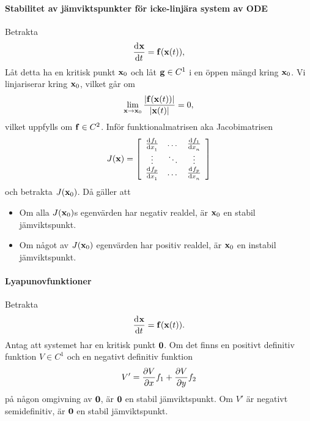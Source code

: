\paragraph{Stabilitet av jämviktspunkter för icke-linjära system av ODE}
Betrakta
\begin{align*}
	\dv[]{\vb{x}}{t} (t) = \vb{f}(\vb{x}(t)),
\end{align*}
Låt detta ha en kritisk punkt $\vb{x}_{0}$ och låt $\vb{g}\in C^{1}$ i en öppen mängd kring $\vb{x}_{0}$. Vi linjariserar kring $\vb{x}_{0}$, vilket går om
\begin{align*}
	\lim\limits_{\vb{x}\to\vb{x}_{0}}\frac{\abs{\vb{f}(\vb{x}(t))}}{\abs{\vb{x}(t)}} = 0,
\end{align*}
vilket uppfylls om $\vb{f}\in C^{2}$. Inför funktionalmatrisen aka Jacobimatrisen
\begin{align*}
	J(\vb{x}) = 
	\left[\begin{array}{ccc}
		\dv[]{f_1}{x_1} (\vb{x}) & \dots  & \dv[]{f_1}{x_n} (\vb{x}) \\
		\vdots                     & \ddots & \vdots \\
		\dv[]{f_p}{x_1} (\vb{x}) & \dots  & \dv[]{f_p}{x_n} (\vb{x})
	\end{array}\right]
\end{align*}
och betrakta $J(\vb{x}_{0})$. Då gäller att
\begin{itemize}
	\item Om alla $J(\vb{x}_{0})$s egenvärden har negativ realdel, är $\vb{x}_{0}$ en stabil jämviktspunkt.
	\item Om något av $J(\vb{x}_{0})$ egenvärden har positiv realdel, är $\vb{x}_{0}$ en instabil jämviktspunkt.
\end{itemize}

\paragraph{Lyapunovfunktioner}
Betrakta
\begin{align*}
	\dv[]{\vb{x}}{t} (t) = \vb{f}(\vb{x}(t)).
\end{align*}
Antag att systemet har en kritisk punkt $\vb{0}$. Om det finns en positivt definitiv funktion $V\in C^{1}$ och en negativt definitiv funktion
\begin{align*}
	V' = \pdv{V}{x}f_{1} + \pdv{V}{y}f_{2}
\end{align*}
på någon omgivning av $\vb{0}$, är $\vb{0}$ en stabil jämviktspunkt. Om $V'$ är negativt semidefinitiv, är $\vb{0}$ en stabil jämviktspunkt.
